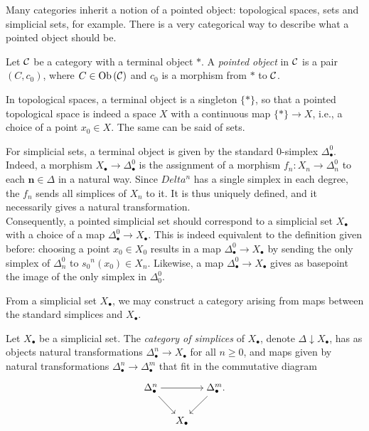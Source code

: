 \begin{digression}
    Many categories inherit a notion of a pointed object: topological spaces, sets and simplicial sets, for example. There is a very categorical way to describe what a pointed object should be.

    Let $\mathcal{C}$ be a category with a terminal object $*$. A \emph{pointed object} in $\mathcal{C}$ is a pair $(C,c_0)$, where $C \in \operatorname{Ob}{\lparen \mathcal{C} \rparen}$ and $c_0$ is a morphism from $*$ to $\mathcal{C}$.

    In topological spaces, a terminal object is a singleton $\{*\}$, so that a pointed topological space is indeed a space $X$ with a continuous map $\{*\} \to X$, i.e., a choice of a point $x_0 \in X$. The same can be said of sets.

    For simplicial sets, a terminal object is given by the standard $0$-simplex $\Delta^0_{\bullet}$. Indeed, a morphism $X_\bullet \to \Delta^0_{\bullet}$ is the assignment of a morphism $f_n : X_n \to \Delta^0_{n}$ to each $\textbf{n} \in \Delta$ in a natural way. Since $Delta^n$ has a single simplex in each degree, the $f_n$ sends all simplices of $X_n$ to it. It is thus uniquely defined, and it necessarily gives a natural transformation. \\
    Consequently, a pointed simplicial set should correspond to a simplicial set $X_\bullet$ with a choice of a map $\Delta^0_{\bullet} \to X_\bullet$. This is indeed equivalent to the definition given before: choosing a point $x_0 \in X_0$ results in a map $\Delta^0_{\bullet} \to X_\bullet$ by sending the only simplex of $\Delta^0_n$ to ${s_0}^{n}(x_0) \in X_n$. Likewise, a map $\Delta^0_{\bullet} \to X_{\bullet}$ gives as basepoint the image of the only simplex in $\Delta^0_0$.
\end{digression}


From a simplicial set $X_{\bullet}$, we may construct a category arising from maps between the standard simplices and $X_{\bullet}$.

\begin{definition}
    Let $X_{\bullet}$ be a simplicial set. The \emph{category of simplices} of $X_{\bullet}$, denote $\Delta \downarrow X_{\bullet}$, has as objects natural transformations $\Delta^n_{\bullet} \to X_{\bullet}$ for all $n \geq 0$, and maps given by natural transformations $\Delta_{\bullet}^n \to \Delta^m_{\bullet}$ that fit in the commutative diagram

    \[\begin{tikzcd}[ampersand replacement=\&,cramped, sep=small]
        {\Delta^n_{\bullet}} \&\& {\Delta^m_{\bullet}.} \\
        \\
        \& X_{\bullet}
        \arrow[from=1-1, to=1-3]
        \arrow[from=1-1, to=3-2]
        \arrow[from=1-3, to=3-2]
    \end{tikzcd}\]
\end{definition}

